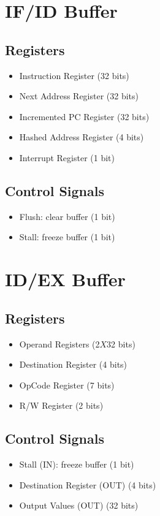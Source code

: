 \documentclass[12pt]{report}
\begin{document}
\section{IF/ID Buffer}

\subsection{Registers}
\begin{itemize}
    \item Instruction Register (32 bits)
    \item Next Address Register (32 bits)
    \item Incremented PC Register (32 bits)
    \item Hashed Address Register (4 bits)
    \item Interrupt Register (1 bit)
\end{itemize}

\subsection{Control Signals}
\begin{itemize}
    \item Flush: clear buffer (1 bit)
    \item Stall: freeze buffer (1 bit)
\end{itemize}

\section{ID/EX Buffer}

\subsection{Registers}
\begin{itemize}
    \item Operand Registers (2$X$32 bits)
    \item Destination Register (4 bits)
    \item OpCode Register (7 bits)
    \item R/W Register (2 bits)
\end{itemize}

\subsection{Control Signals}
\begin{itemize}
    \item Stall (IN): freeze buffer (1 bit)
    \item Destination Register (OUT) (4 bits)
    \item Output Values (OUT) (32 bits)
\end{itemize}
\end{document}
